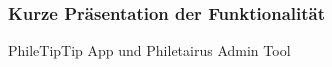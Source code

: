 \begin{frame}
\frametitle{Kurze Präsentation der Funktionalität}
	PhileTipTip App und Philetairus Admin Tool

\end{frame}